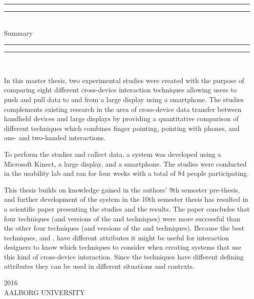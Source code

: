 \begin{dummy}

	\textheight
	\centering
	\vspace*{\baselineskip}
	\rule{\textwidth}{2pt}\vspace*{-\baselineskip}\vspace*{2pt}
	\rule{\textwidth}{0.4pt}\\[\baselineskip]
	{\LARGE Summary}\\[0.2\baselineskip]
	\rule{\textwidth}{0.4pt}\vspace*{-\baselineskip}\vspace{3.2pt}
	\rule{\textwidth}{2pt}\\[\baselineskip]
	\scshape
	{} \par

\begin{summary}
In this master thesis, two experimental studies were created with the purpose of comparing eight different cross-device interaction techniques allowing users to push and pull data to and from a large display using a smartphone.
The studies complements existing research in the area of cross-device data transfer between handheld devices and large displays by providing a quantitative comparison of different techniques which combines finger pointing, pointing with phones, and one- and two-handed interactions.

To perform the studies and collect data, a system was developed using a Microsoft Kinect, a large display, and a smartphone.
The studies were conducted in the usability lab and ran for four weeks with a total of 84 people participating. 

This thesis builds on knowledge gained in the authors' 9th semester pre-thesis, and further development of the system in the 10th semester thesis has resulted in a scientific paper presenting the studies and the results.
The paper concludes that four techniques (\pull and \push versions of the \swipe and \throw techniques) were more successful than the other four techniques (\pull and \push versions of the \grab and \tilt techniques).
Because the best techniques, \swipe and \throw, have different attributes it might be useful for interaction designers to know which techniques to consider when creating systems that use this kind of cross-device interaction. 
Since the techniques have different defining attributes they can be used in different situations and contexts.
\end{summary}
	\vspace*{2\baselineskip}
		{\scshape 2016} \\
		{\large AALBORG UNIVERSITY}\par
	
\end{dummy}